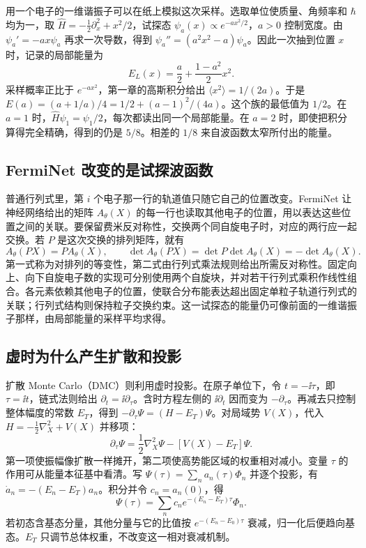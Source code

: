 用一个电子的一维谐振子可以在纸上模拟这次采样。选取单位使质量、角频率和 $\hbar$ 均为一，取 $\hat H=-\tfrac12\partial_x^2+x^2/2$，试探态 $\psi_a(x)\propto e^{-ax^2/2}$，$a>0$ 控制宽度。由 $\psi_a'=-ax\psi_a$ 再求一次导数，得到 $\psi_a''=(a^2x^2-a)\psi_a$。因此一次抽到位置 $x$ 时，记录的局部能量为
\[
 E_L(x)=\frac a2+\frac{1-a^2}{2}x^2 .
\]
采样概率正比于 $e^{-ax^2}$，第一章的高斯积分给出 $\langle x^2\rangle=1/(2a)$。于是 $E(a)=(a+1/a)/4=1/2+(a-1)^2/(4a)$。这个族的最低值为 $1/2$。在 $a=1$ 时，$\hat H\psi_1=\psi_1/2$，每次都读出同一个局部能量。在 $a=2$ 时，即使把积分算得完全精确，得到的仍是 $5/8$。相差的 $1/8$ 来自波函数太窄所付出的能量。

\subsection{FermiNet 改变的是试探波函数}
普通行列式里，第 $i$ 个电子那一行的轨道值只随它自己的位置改变。FermiNet 让神经网络给出的矩阵 $A_\theta(X)$ 的每一行也读取其他电子的位置，用以表达这些位置之间的关联。要保留费米反对称性，交换两个同自旋电子时，对应的两行应一起交换。若 $P$ 是这次交换的排列矩阵，就有
\begin{equation}
A_\theta(PX)=P A_\theta(X),\qquad
\det A_\theta(PX)=\det P\det A_\theta(X)=-\det A_\theta(X).
\end{equation}
第一式称为对排列的等变性，第二式由行列式乘法规则给出所需反对称性。固定向上、向下自旋电子数的实现可分别使用两个自旋块，并对若干行列式乘积作线性组合。各元素依赖其他电子的位置，使联合分布能表达超出固定单粒子轨道行列式的关联；行列式结构则保持粒子交换约束。这一试探态的能量仍可像前面的一维谐振子那样，由局部能量的采样平均求得。

\subsection{虚时为什么产生扩散和投影}

扩散 Monte Carlo（DMC）则利用虚时投影。在原子单位下，令 $t=-\ii\tau$，即 $\tau=\ii t$，链式法则给出 $\partial_t=\ii\partial_\tau$。含时方程左侧的 $\ii\partial_t$ 因而变为 $-\partial_\tau$。再减去只控制整体幅度的常数 $E_T$，得到
$-\partial_\tau\Psi=(H-E_T)\Psi$。对局域势 $V(X)$，代入 $H=-\tfrac12\nabla_X^2+V(X)$ 并移项：
\begin{equation}
\partial_\tau\Psi=\frac12\nabla_X^2\Psi-[V(X)-E_T]\Psi.
\end{equation}
第一项使振幅像扩散一样摊开，第二项使高势能区域的权重相对减小。变量 $\tau$ 的作用可从能量本征基中看清。写 $\Psi(\tau)=\sum_n a_n(\tau)\Phi_n$ 并逐个投影，有 $\dot a_n=-(E_n-E_T)a_n$。积分并令 $c_n=a_n(0)$，得
\begin{equation}
\Psi(\tau)=\sum_n c_n e^{-(E_n-E_T)\tau}\Phi_n.
\end{equation}
若初态含基态分量，其他分量与它的比值按 $e^{-(E_n-E_0)\tau}$ 衰减，归一化后便趋向基态。$E_T$ 只调节总体权重，不改变这一相对衰减机制。

